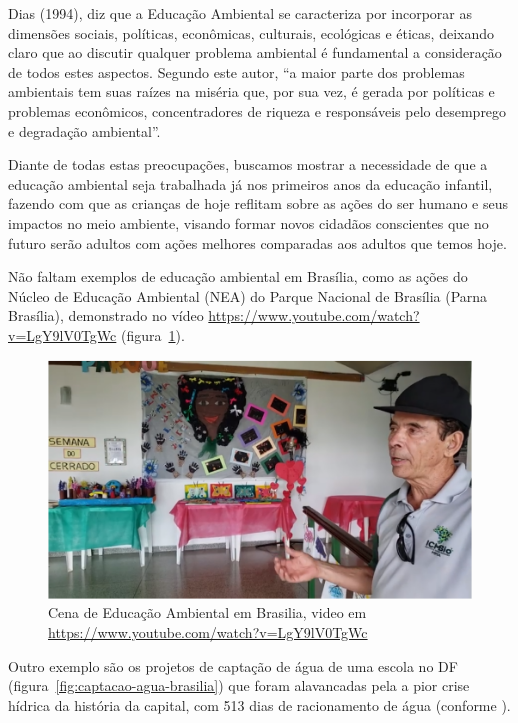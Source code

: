 Dias (1994), diz que a Educação Ambiental se caracteriza por incorporar as dimensões sociais, políticas, econômicas, culturais, ecológicas e éticas, deixando claro que ao discutir qualquer problema ambiental é fundamental a consideração de todos estes aspectos. Segundo este autor, “a maior parte dos problemas ambientais tem suas raízes na miséria que, por sua vez, é gerada por políticas e problemas econômicos, concentradores de riqueza e responsáveis pelo desemprego e degradação ambiental”.

Diante de todas estas preocupações, buscamos mostrar a necessidade de que a educação ambiental seja trabalhada já nos primeiros anos da educação infantil, fazendo com que as crianças de hoje reflitam sobre as ações do ser humano e seus impactos no meio ambiente, visando formar novos cidadãos conscientes que no futuro serão adultos com ações melhores comparadas aos adultos que temos hoje.

Não faltam exemplos de educação ambiental em Brasília, como as ações do Núcleo de Educação Ambiental (NEA) do Parque Nacional de Brasília (Parna Brasília), demonstrado no vídeo \url{https://www.youtube.com/watch?v=LgY9lV0TgWc} (figura~\ref{fig:educacao-ambiental-em-brasilia}).

\begin{figure}[h!]
    \centering
    \includegraphics[width=0.7\linewidth]{"fig/Educação Ambiental em Brasília"}
    \caption[Educação Ambiental em Brasilia]{Cena de Educação Ambiental em Brasilia, video em \url{https://www.youtube.com/watch?v=LgY9lV0TgWc}}
    \label{fig:educacao-ambiental-em-brasilia}
\end{figure}

Outro exemplo são os projetos de captação de água de uma escola no DF (figura~\ref{fig:captacao-agua-brasilia}) que foram alavancadas pela a pior crise hídrica da história da capital, com 513 dias de racionamento de água (conforme ).

